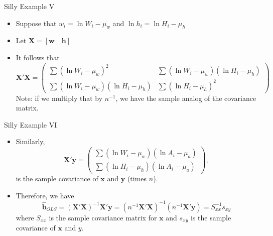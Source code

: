 \documentclass[aspectratio=169,11pt]{beamer}
\begin{document}
\begin{frame}{Silly Example V}


	\begin{itemize}
	\item Suppose that $w_{i}=\ln W_{i}-\mu_{w}$ and $\ln h_{i}=\ln H_{i}-\mu_{h}$


	\item Let $\boldsymbol{X}=\left[\boldsymbol{w}\quad\boldsymbol{h}\right]$

	\item It follows that 
\[
\boldsymbol{X}'\boldsymbol{X}=\left(\begin{array}{cc}
\sum\left(\ln W_{i}-\mu_{w}\right)^{2} & \sum\left(\ln W_{i}-\mu_{w}\right)\left(\ln H_{i}-\mu_{h}\right)\\
\sum\left(\ln W_{i}-\mu_{w}\right)\left(\ln H_{i}-\mu_{h}\right) & \sum\left(\ln H_{i}-\mu_{h}\right)^{2}
\end{array}\right)
\]
Note: if we multiply that by $n^{-1}$, we have the sample analog of the
covariance matrix. 
	
\end{itemize}
\end{frame}

\begin{frame}{Silly Example VI}

	\begin{itemize}
	\item Similarly,
\[
\boldsymbol{X'}\boldsymbol{y}=\left(\begin{array}{c}
\sum\left(\ln W_{i}-\mu_{w}\right)\left(\ln A_{i}-\mu_{a}\right)\\
\sum\left(\ln H_{i}-\mu_{h}\right)\left(\ln A_{i}-\mu_{a}\right)
\end{array}\right),
\]
is the sample covariance of $\boldsymbol{x}$ and $\boldsymbol{y}$
(times $n$). 

\smallskip
\item Therefore, we have
\[
\widehat{\boldsymbol{b}}_{OLS}=\left(\boldsymbol{X}'\boldsymbol{X}\right)^{-1}\boldsymbol{X}'\boldsymbol{y}=\left(n^{-1}\boldsymbol{X}'\boldsymbol{X}\right)^{-1}\left(n^{-1}\boldsymbol{X}'\boldsymbol{y}\right)=S_{xx}^{-1}s_{xy}
\]
where $S_{xx}$ is the sample covariance matrix for $\boldsymbol{x}$
and $s_{xy}$ is the sample covariance of $\boldsymbol{x}$ and $y$. 

\end{itemize}
\end{frame}
\end{document}
